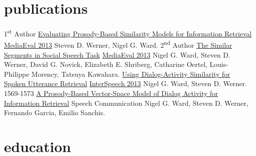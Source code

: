 \documentclass[]{friggeri-cv} %
\begin{document}
\section{publications}

\begin{entrylist}
\entry
{1\textsuperscript{st} Author}
{\href{http://ceur-ws.org/Vol-1043/mediaeval2013_submission_52.pdf}{Evaluating Prosody-Based Similarity Models for Information Retrieval}}
{\href{http://ceur-ws.org/Vol-1043/}{MediaEval 2013}}
{Steven D. Werner, Nigel G. Ward.}
\entry
{2\textsuperscript{nd} Author}
{\href{http://ceur-ws.org/Vol-1043/mediaeval2013_submission_2.pdf}{The Similar Segments in Social Speech Task} }
{\href{http://ceur-ws.org/Vol-1043/}{MediaEval 2013}}
{Nigel G. Ward, Steven D. Werner, David G. Novick, Elizabeth E. Shriberg, Catharine Oertel, Louis-Philippe Morency, Tatsuya Kawahara.}
\entry
{}
{\href{http://www.isca-speech.org/archive/interspeech_2013/i13_1569.html}{Using Dialog-Activity Similarity for Spoken Utterance Retrieval}}
{\href{http://www.isca-speech.org/archive/interspeech_2013/}{InterSpeech 2013}}
{Nigel G. Ward, Steven D. Werner. 1569-1573}
\entry
{}
{\href{http://www.cs.utep.edu/nigel/abstracts/prosody-ir.html}{A Prosody-Based Vector-Space Model of Dialog Activity for Information Retrieval}}
{Speech Communication}
{Nigel G. Ward, Steven D. Werner, Fernando Garcia, Emilio Sanchis.}
\end{entrylist}


\section{education}
\end{document}
